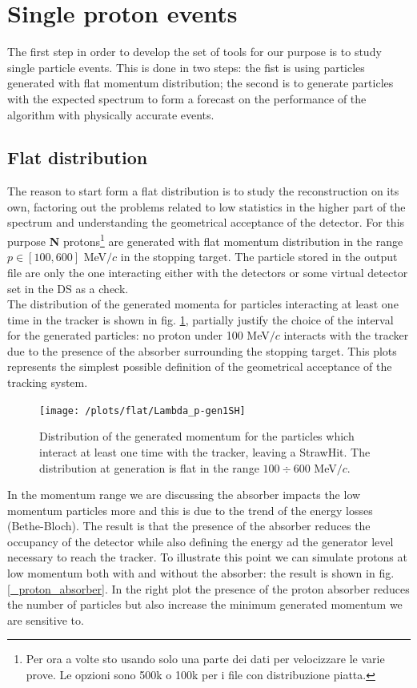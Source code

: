 \documentclass[12pt,a4paper,openright, oneside, titlepage]{book} %
\begin{document}
\section{Single proton events}
The first step in order to develop the set of tools for our purpose is to study single particle events. 
This is done in two steps: the fist is using particles generated with flat momentum distribution; the second is to generate particles with the expected spectrum to form a forecast on the performance of the algorithm with physically accurate events.

\subsection{Flat distribution}
The reason to start form a flat distribution is to study the reconstruction on its own, factoring out the problems related to low statistics in the higher part of the spectrum and understanding the geometrical acceptance of the detector. 
For this purpose \textbf{N} protons\footnote{Per ora a volte sto usando solo una parte dei dati per velocizzare le varie prove. Le opzioni sono 500k o 100k per i file con distribuzione piatta.} are generated with flat momentum distribution in the range $p\in[100,600]$ MeV$/c$ in the stopping target. The particle stored in the output file are only the one interacting either with the detectors or some virtual detector set in the DS as a check.\\
The distribution of the generated momenta for particles interacting at least one time in the tracker is shown in fig. \ref{_flat_Lambda_p-gen1SH}, partially justify the choice of the interval for the generated particles: no proton under 100 MeV$/c$ interacts with the tracker due to the presence of the absorber surrounding the stopping target. This plots represents the simplest possible definition of the geometrical acceptance of the tracking system. \\

\begin{figure}[h!]
\centering
\texttt{[image: /plots/flat/Lambda\_p-gen1SH]}
\caption{Distribution of the generated momentum for the particles which interact at least one time with the tracker, leaving a StrawHit. The distribution at generation is flat in the range $100 \div 600$ MeV$/c$.}
\label{_flat_Lambda_p-gen1SH}
\end{figure}

\noindent In the momentum range we are discussing the absorber impacts the low momentum particles more and this is due to the trend of the energy losses (Bethe-Bloch). 
The result is that the presence of the absorber reduces the occupancy of the detector while also defining the energy ad the generator level necessary to reach the tracker. 
To illustrate this point we can simulate protons at low momentum both with and without the absorber: the result is shown in fig. \ref{_proton_absorber}. In the right plot the presence of the proton absorber reduces the number of particles but also increase the minimum generated momentum we are sensitive to. \\
\end{document}
